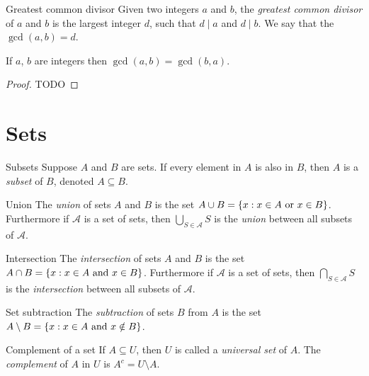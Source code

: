\documentclass{report}
\begin{document}
\begin{definition}{Greatest common divisor}{}
  Given two integers $a$ and $b$, the \emph{greatest common divisor} of $a$ and $b$ is the largest integer $d$, such that $d \mid a$ and $d \mid b$.
  We say that the $\gcd(a, b) = d$.
\end{definition}


\begin{lemma}{}{}
  If $a$, $b$  are integers then $\gcd(a, b)  = \gcd(b, a)$.
\end{lemma}

\begin{proof}
  TODO
\end{proof}

\chapter{Sets}


\begin{definition}{Subsets}{}
  Suppose $A$ and $B$ are sets. If every element in $A$ is also in $B$, then $A$ is a \emph{subset} of $B$, denoted $A \subseteq B$.
\end{definition}

\begin{definition}{Union}{}
  The \emph{union} of sets $A$ and $B$ is the set $A \cup B = \{x : x \in A \text{ or } x \in B\}$.
  Furthermore if $\mathscr{A}$ is a set of sets, then $\bigcup_{S \in \mathscr{A}} S$ is the \emph{union} between all subsets of $\mathscr{A}$.
\end{definition}

\begin{definition}{Intersection}{}
  The \emph{intersection} of sets $A$ and $B$ is the set $A \cap B = \{x : x \in A \text{ and } x \in B\}$.
  Furthermore if $\mathscr{A}$ is a set of sets, then $\bigcap_{S \in \mathscr{A}} S$ is the \emph{intersection} between all subsets of $\mathscr{A}$.
\end{definition}

\begin{definition}{Set subtraction}{}
  The \emph{subtraction} of sets $B$ from $A$ is the set $A \setminus B = \{x : x \in A \text{ and } x \notin B\}$.
\end{definition}

\begin{definition}{Complement of a set}{}
  If $A \subseteq U$, then $U$ is called a \emph{universal set} of $A$.
  The \emph{complement} of $A$ in $U$ is $A^c = U \setminus A$.

\end{definition}
\end{document}
